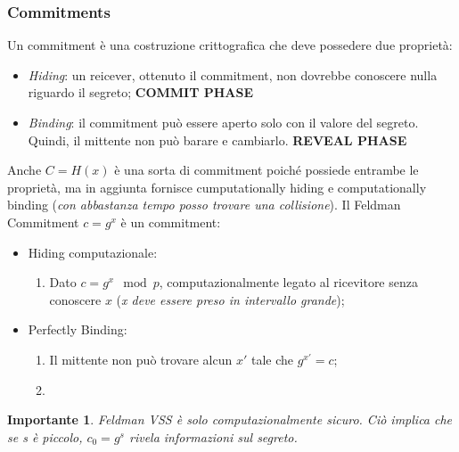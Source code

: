 \documentclass{book}
\newtheorem*{Importante}{\textbf{Importante}}
\begin{document}
\subsubsection{Commitments}
Un commitment è una costruzione crittografica che deve possedere due proprietà:\begin{itemize}
    \item \emph{Hiding}: un reicever, ottenuto il commitment, non dovrebbe conoscere nulla riguardo il segreto; \textbf{COMMIT PHASE}
    \item \emph{Binding}: il commitment può essere aperto solo con il valore del segreto\@. Quindi, il mittente non può barare e cambiarlo. \textbf{REVEAL PHASE}
\end{itemize}
Anche \(C=H(x)\) è una sorta di commitment poiché possiede entrambe le proprietà, ma in aggiunta fornisce cumputationally hiding e computationally binding (\emph{con abbastanza tempo posso trovare una collisione})\@.\newline
Il Feldman Commitment \(c=g^{x}\) è un commitment:\begin{itemize}
    \item Hiding computazionale:\begin{enumerate}
              \item Dato \(c=g^{x}\mod{p}\), computazionalmente legato al ricevitore senza conoscere \(x\) (\emph{x deve essere preso in intervallo grande});
          \end{enumerate}
    \item Perfectly Binding:\begin{enumerate}
              \item Il mittente non può trovare alcun \(x'\) tale che \(g^{x'}=c\);
              \item
          \end{enumerate}

\end{itemize}
\begin{Importante}
    Feldman VSS è solo computazionalmente sicuro\@. Ciò implica che se s è piccolo, \(c_{0}=g^{s}\) rivela informazioni sul segreto.
\end{Importante}
\end{document}
